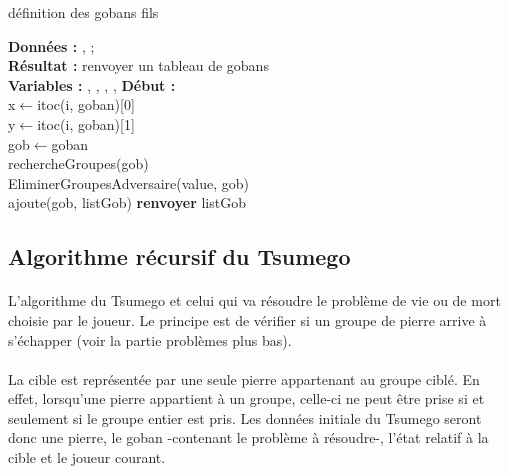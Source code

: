             \begin{algorithme}
                \caption{définition des gobans fils}
                \textbf{Données :}
                ,
                ;\\
                \textbf{Résultat :} renvoyer un tableau de gobans\\
                \textbf{Variables :}
                ,
                ,
                ,
                ,
                \textbf{Début :}\\
                {
                    x$\leftarrow$itoc(i, goban)[0]\\
                    y$\leftarrow$itoc(i, goban)[1]\\
                    gob$\leftarrow$goban\\
                    {
                        rechercheGroupes(gob)\\
                        EliminerGroupesAdversaire(value, gob)\\
                        ajoute(gob, listGob)
                    }
                }
                \textbf{renvoyer} listGob
            \end{algorithme}
            
        \subsection{Algorithme récursif du Tsumego}
            \paragraph{}L'algorithme du Tsumego et celui qui va résoudre le problème de vie ou de mort choisie par le joueur. Le principe est de vérifier si un groupe de pierre arrive à s'échapper (voir la partie problèmes plus bas).
            
            \paragraph{}La cible est représentée par une seule pierre appartenant au groupe ciblé. En effet, lorsqu'une pierre appartient à un groupe, celle-ci ne peut être prise si et seulement si le groupe entier est pris. Les données initiale du Tsumego seront donc une pierre, le goban -contenant le problème à résoudre-, l'état relatif à la cible et le joueur courant.
            
